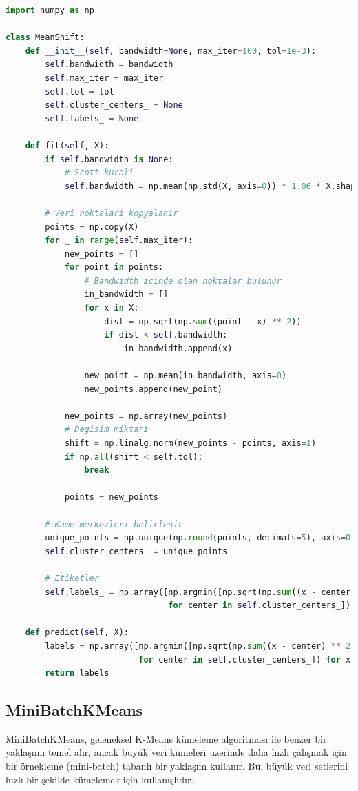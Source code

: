 \begin{lstlisting}[language=Python, caption=Scikit-learn'de MeanShift örneği.]
import numpy as np

class MeanShift:
    def __init__(self, bandwidth=None, max_iter=100, tol=1e-3):
        self.bandwidth = bandwidth
        self.max_iter = max_iter
        self.tol = tol
        self.cluster_centers_ = None
        self.labels_ = None

    def fit(self, X):
        if self.bandwidth is None:
            # Scott kurali
            self.bandwidth = np.mean(np.std(X, axis=0)) * 1.06 * X.shape[0] ** (-1 / 5.)

        # Veri noktalari kopyalanir
        points = np.copy(X)
        for _ in range(self.max_iter):
            new_points = []
            for point in points:
                # Bandwidth icinde olan noktalar bulunur
                in_bandwidth = []
                for x in X:
                    dist = np.sqrt(np.sum((point - x) ** 2))
                    if dist < self.bandwidth:
                        in_bandwidth.append(x)
    
                new_point = np.mean(in_bandwidth, axis=0)
                new_points.append(new_point)

            new_points = np.array(new_points)
            # Degisim miktari
            shift = np.linalg.norm(new_points - points, axis=1)
            if np.all(shift < self.tol):
                break

            points = new_points

        # Kume merkezleri belirlenir
        unique_points = np.unique(np.round(points, decimals=5), axis=0)
        self.cluster_centers_ = unique_points

        # Etiketler
        self.labels_ = np.array([np.argmin([np.sqrt(np.sum((x - center) ** 2)) 
                                 for center in self.cluster_centers_]) for x in X])

    def predict(self, X):
        labels = np.array([np.argmin([np.sqrt(np.sum((x - center) ** 2))
                           for center in self.cluster_centers_]) for x in X])
        return labels
\end{lstlisting}

\newpage

\subsection{MiniBatchKMeans}
MiniBatchKMeans, geleneksel K-Means kümeleme algoritması ile benzer bir yaklaşımı temel alır, ancak büyük veri kümeleri üzerinde daha hızlı çalışmak için bir örnekleme (mini-batch) tabanlı bir yaklaşım kullanır. Bu, büyük veri setlerini hızlı bir şekilde kümelemek için kullanışlıdır.

